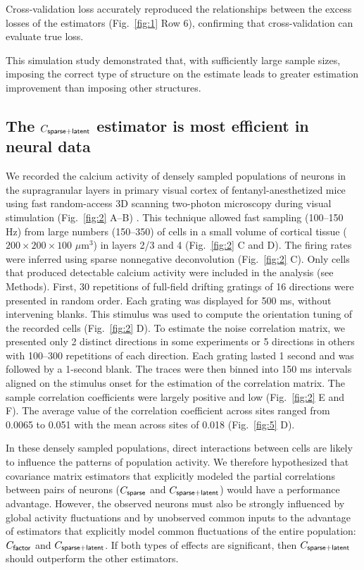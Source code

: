 Cross-validation loss accurately reproduced the relationships between the excess losses of the estimators (Fig.~\ref{fig:1} Row 6), confirming that cross-validation can evaluate true loss.

This simulation study demonstrated that, with sufficiently large sample sizes, imposing the correct type of structure on the estimate leads to greater estimation improvement than imposing other structures.

\subsection*{The $C_{\sf sparse+latent}$ estimator is most efficient in neural data}
We recorded the calcium activity of densely sampled populations of neurons in the supragranular layers in primary visual cortex of fentanyl-anesthetized mice using fast random-access 3D scanning two-photon microscopy during visual stimulation (Fig.~\ref{fig:2} A--B) \cite{Reddy:2005, Katona:2012, Cotton:2013}. This technique allowed fast sampling (100--150 Hz) from large numbers (150--350) of cells in a small volume of cortical tissue ($200\times200\times100$ $\mu$m$^3$) in layers 2/3 and 4 (Fig.~\ref{fig:2} C and D).  The firing rates were inferred using sparse nonnegative deconvolution \cite{Vogelstein:2010} (Fig.~\ref{fig:2} C). Only cells that produced detectable calcium activity were included in the analysis (see Methods).  First, 30 repetitions of full-field drifting gratings of 16 directions were presented in random order.  Each grating was displayed for 500 ms, without intervening blanks.  This stimulus was used to compute the orientation tuning of the recorded cells (Fig.~\ref{fig:2} D). To estimate the noise correlation matrix, we presented only 2 distinct directions in some experiments or 5 directions in others with 100--300 repetitions of each direction. Each grating lasted 1 second and was followed by a 1-second blank.  The traces were then binned into 150 ms intervals aligned on the stimulus onset for the estimation of the correlation matrix.   The sample correlation coefficients were largely positive and low (Fig.~\ref{fig:2} E and F). The average value of the correlation coefficient across sites ranged from 0.0065 to 0.051 with the mean across sites of 0.018 (Fig.~\ref{fig:5} D).

In these densely sampled populations, direct interactions between cells are likely to influence the patterns of population activity.  We therefore hypothesized that covariance matrix estimators that explicitly modeled the partial correlations between pairs of neurons ($C_{\sf sparse}$ and $C_{\sf sparse+latent}$) would have a performance advantage.  However, the observed neurons must also be strongly influenced by global activity fluctuations and by unobserved common inputs to the advantage of estimators that explicitly model common fluctuations of the entire population: $C_{\sf factor}$ and $C_{\sf sparse+latent}$.  If both types of effects are significant, then $C_{\sf sparse+latent}$ should outperform the other estimators.

